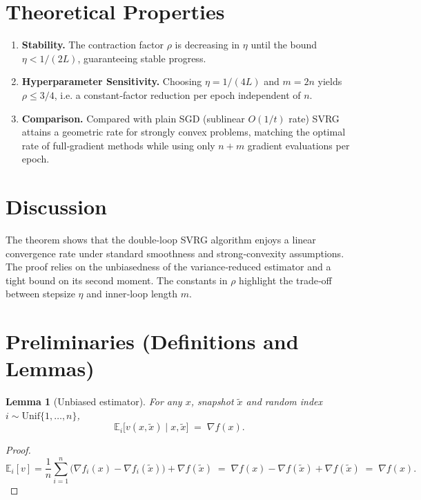 \documentclass{article}
\newtheorem{lemma}{Lemma}
\newcommand{\E}{\mathbb{E}}
\newcommand{\grad}{\nabla}
\begin{document}
\section*{Theoretical Properties}
\begin{enumerate}[label=\textbf{P\arabic*:}, leftmargin=*, itemsep=0.3ex]
\item \textbf{Stability.} The contraction factor $\rho$ is decreasing in $\eta$
until the bound $\eta<1/(2L)$, guaranteeing stable progress.
\item \textbf{Hyperparameter Sensitivity.} Choosing $\eta=1/(4L)$ and $m=2n$ yields
$\rho\le 3/4$, i.e. a constant‑factor reduction per epoch independent of $n$.
\item \textbf{Comparison.} Compared with plain SGD (sublinear $O(1/t)$ rate) SVRG attains a
geometric rate for strongly convex problems, matching the optimal rate of
full‑gradient methods while using only $n+m$ gradient evaluations per epoch.
\end{enumerate}

\section*{Discussion}
The theorem shows that the double‑loop SVRG algorithm enjoys a linear
convergence rate under standard smoothness and strong‑convexity assumptions.
The proof relies on the unbiasedness of the variance‑reduced estimator and a
tight bound on its second moment. The constants in $\rho$ highlight the
trade‑off between stepsize $\eta$ and inner‑loop length $m$.

\section*{Preliminaries (Definitions and Lemmas)}
\begin{lemma}[Unbiased estimator]\label{lem:unbiased}
For any $x$, snapshot $\tilde{x}$ and random index $i\sim\mathrm{Unif}\{1,\dots,n\}$,
\[
\E_{i}\!\bigl[v(x,\tilde{x})\mid x,\tilde{x}\bigr]
\;=\;\grad f(x).
\tag{8}
\]
\end{lemma}
\begin{proof}
\[
\E_{i}[v]=\frac1n\sum_{i=1}^{n}
\bigl(\grad f_i(x)-\grad f_i(\tilde{x})\bigr)+\grad f(\tilde{x})
\;=\;\grad f(x)-\grad f(\tilde{x})+\grad f(\tilde{x})
\;=\;\grad f(x).
\] 
\end{proof}
\end{document}
